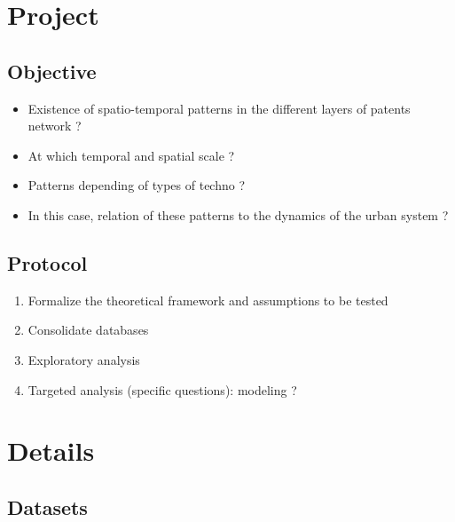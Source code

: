 \section{Project}

\subsection{Objective}

\begin{itemize}
	\item Existence of spatio-temporal patterns in the different layers of patents network ?
    \item At which temporal and spatial scale ?
	\item Patterns depending of types of techno ?
	\item In this case, relation of these patterns to the dynamics of the urban system ?
\end{itemize}



\subsection{Protocol}


\begin{enumerate}
	\item Formalize the theoretical framework and assumptions to be tested
	\item Consolidate databases
	\item Exploratory analysis
	\item Targeted analysis (specific questions): modeling ?
\end{enumerate}



\section{Details}


\subsection{Datasets}

